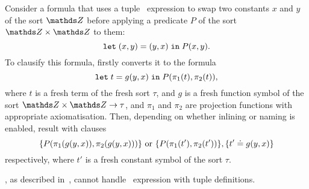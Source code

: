\begin{example} Consider a formula that uses a tuple \LETIN\ expression to swap two constants $x$ and $y$ of the sort $\Z$ before applying a predicate $P$ of the sort $\Z \times \Z$ to them:
\begin{equation*}\label{eq:tuple-let-example}
  \mathtt{let}\;{(x,y)}={(y,x)}\;\allowbreak\mathtt{in}\;{P(x,y)}.
\end{equation*}
To clausify this formula, \nfcnf{} firstly converts it to the formula $$\mathtt{let}\;{t}={g(y,x)}\;\allowbreak\mathtt{in}\;{P(\pi_1(t), \pi_2(t))},$$ where $t$ is a fresh term of the fresh sort $\tau$, and $g$ is a fresh function symbol of the sort $\Z \times \Z \to \tau$, and $\pi_1$ and $\pi_2$ are projection functions with appropriate axiomatisation. Then, depending on whether inlining or naming is enabled, \nfcnf{} result with clauses $$\{P(\pi_1(g(y,x)),\pi_2(g(y,x)))\} \text{~or~} \{P(\pi_1(t'),\pi_2(t'))\}, \{t' \doteq g(y,x)\}$$ respectively, where $t'$ is a fresh constant symbol of the sort $\tau$.
\QED\end{example}

\oldcnf{}, as described in~\cite{FOOL}, cannot handle \LETIN\ expression with tuple definitions.
